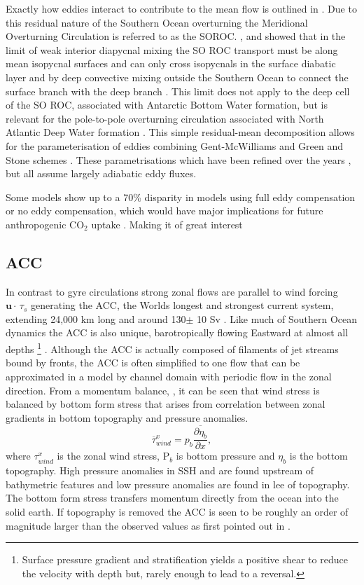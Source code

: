 Exactly how eddies interact to contribute to the mean flow is outlined in . Due to this residual nature of the Southern Ocean overturning the Meridional Overturning Circulation is referred to as the \gls{SOROC}. \citet{Toggweiler2008}, \citet{Marshall2003} and \citet{speer2000} showed that in the limit of weak interior diapycnal mixing the SO ROC transport must be along mean isopycnal surfaces and can only cross isopycnals in the surface diabatic layer and by deep convective mixing outside the Southern Ocean to connect the surface branch with the deep branch . This limit does not apply to the deep cell of the SO ROC, associated with Antarctic Bottom Water formation, but is relevant for the pole-to-pole overturning circulation associated with North Atlantic Deep Water formation \citep{Wolfe2011}. This simple residual-mean decomposition allows for the parameterisation of eddies combining Gent-McWilliams and Green and Stone schemes \citep{Visbeck1997}. These parametrisations which have been refined over the years \citep[e.g.]{jansen2015}, but all assume largely adiabatic eddy fluxes. 

Some models show up to a 70\% disparity in models using full eddy compensation or no eddy compensation, which would have major implications for future anthropogenic CO$_2$ uptake \citep{lequere2007}. Making it of great interest

\subsection{ACC}

In contrast to gyre circulations strong zonal flows are parallel to wind forcing $\textbf{u} \cdot \, \tau _s$ generating the ACC, the Worlds longest and strongest current system, extending 24,000 km long and around 130$\pm $ 10 Sv \citep{whitworth1985}. Like much of Southern Ocean dynamics the ACC is also unique, barotropically flowing Eastward at almost all depths \footnote{Surface pressure gradient and stratification yields a positive shear to reduce the velocity with depth but, rarely enough to lead to a reversal.}%
. Although the  ACC is actually composed of filaments of jet streams bound by fronts, the ACC is often simplified to one flow that can be approximated in a model by channel domain with periodic flow in the zonal direction. From a momentum balance, , it can be seen that wind stress is balanced by bottom form stress that arises from correlation between zonal gradients in bottom topography and pressure anomalies.
\begin{equation}
\overline{\tau}^{x} _{wind} = p_b \frac{\overline{\partial \eta_b}}{\partial x},
\label{eq:mombalance}
\end{equation}  
where $\tau ^x _{wind} $ is the zonal wind stress, P$_b$ is bottom pressure and $\eta _b$ is the bottom topography. High pressure anomalies in SSH and are found upstream of bathymetric features and low pressure anomalies are found in lee of topography. The bottom form stress transfers momentum directly from the ocean into the solid earth. If topography is removed the ACC is seen to be roughly an order of magnitude larger than the observed values as first pointed out in \citet{munk1951}. 

